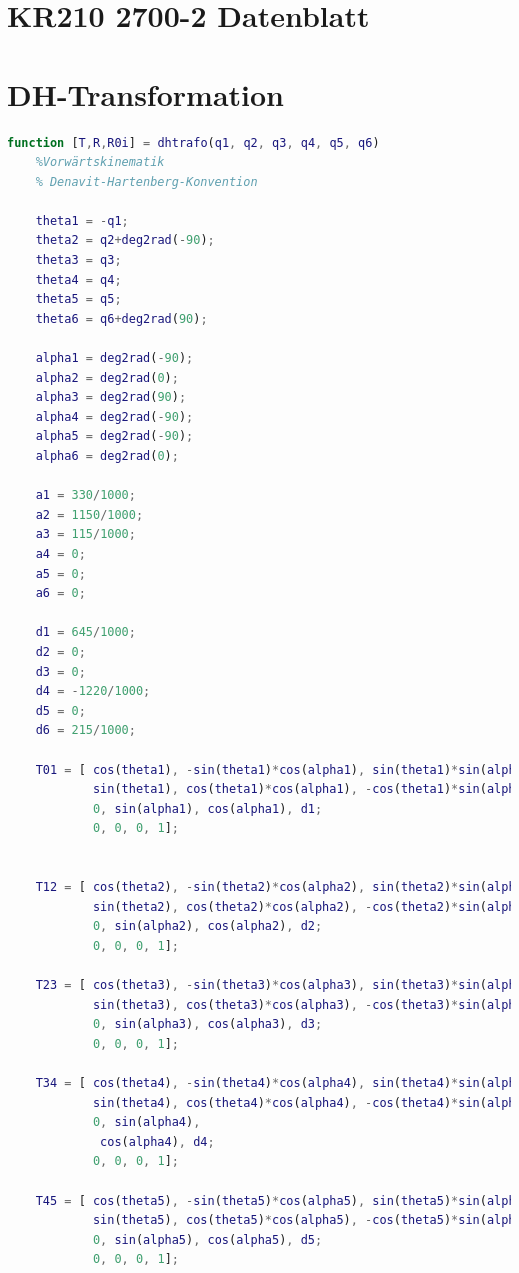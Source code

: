\section{KR210 2700-2 Datenblatt}
\label{add:datenblatt}

\section{DH-Transformation}
\label{add:dh}
%
\begin{lstlisting}[language=Matlab]
	function [T,R,R0i] = dhtrafo(q1, q2, q3, q4, q5, q6)
	%Vorwärtskinematik
	% Denavit-Hartenberg-Konvention
	
	theta1 = -q1;
	theta2 = q2+deg2rad(-90);
	theta3 = q3;
	theta4 = q4;
	theta5 = q5;
	theta6 = q6+deg2rad(90);
	
	alpha1 = deg2rad(-90);
	alpha2 = deg2rad(0);
	alpha3 = deg2rad(90);
	alpha4 = deg2rad(-90);
	alpha5 = deg2rad(-90);
	alpha6 = deg2rad(0);
	
	a1 = 330/1000;
	a2 = 1150/1000;
	a3 = 115/1000;
	a4 = 0;
	a5 = 0;
	a6 = 0;
	
	d1 = 645/1000;
	d2 = 0;
	d3 = 0;
	d4 = -1220/1000;
	d5 = 0;
	d6 = 215/1000;
	
	T01 = [ cos(theta1), -sin(theta1)*cos(alpha1), sin(theta1)*sin(alpha1), a1*cos(theta1);
			sin(theta1), cos(theta1)*cos(alpha1), -cos(theta1)*sin(alpha1), a1*sin(theta1);
			0, sin(alpha1), cos(alpha1), d1;
			0, 0, 0, 1];
	
	
	T12 = [ cos(theta2), -sin(theta2)*cos(alpha2), sin(theta2)*sin(alpha2), a2*cos(theta2);
			sin(theta2), cos(theta2)*cos(alpha2), -cos(theta2)*sin(alpha2), a2*sin(theta2);
			0, sin(alpha2), cos(alpha2), d2;
			0, 0, 0, 1];
	
	T23 = [ cos(theta3), -sin(theta3)*cos(alpha3), sin(theta3)*sin(alpha3), a3*cos(theta3);
			sin(theta3), cos(theta3)*cos(alpha3), -cos(theta3)*sin(alpha3), a3*sin(theta3);
			0, sin(alpha3), cos(alpha3), d3;
			0, 0, 0, 1];
	
	T34 = [ cos(theta4), -sin(theta4)*cos(alpha4), sin(theta4)*sin(alpha4), a4*cos(theta4);
			sin(theta4), cos(theta4)*cos(alpha4), -cos(theta4)*sin(alpha4), a4*sin(theta4);
			0, sin(alpha4), 
			 cos(alpha4), d4;
			0, 0, 0, 1];
	
	T45 = [ cos(theta5), -sin(theta5)*cos(alpha5), sin(theta5)*sin(alpha5), a5*cos(theta5);
			sin(theta5), cos(theta5)*cos(alpha5), -cos(theta5)*sin(alpha5), a5*sin(theta5);
			0, sin(alpha5), cos(alpha5), d5;
			0, 0, 0, 1];
	

\end{lstlisting}
